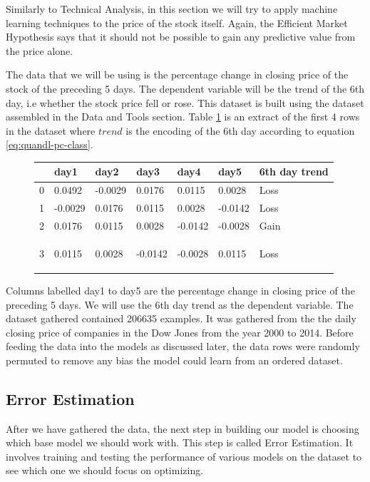 \documentclass{report}
\begin{document}
Similarly to Technical Analysis, in this section we will try to apply machine learning techniques to the price of the stock itself. Again, the Efficient Market Hypothesis says that it should not be possible to gain any predictive value from the price alone.

The data that we will be using is the percentage change in closing price of the stock of the preceding 5 days. The dependent variable will be the trend of the 6th day, i.e whether the stock price fell or rose. This dataset is built using the dataset assembled in the Data and Tools section. Table \ref{table:data-example-1} is an extract of the first 4 rows in the dataset where $trend$ is the encoding of the 6th day according to equation \ref{eq:quandl-pc-class}.

\begin{figure}
  \vspace{8pt}
    \begin{tabular}{l | l | l | l | l | l | l }
	& day1 & day2 &	day3 & day4 & day5  & 6th day trend \\ \hline
0	& 0.0492 &	-0.0029 &	0.0176 &	0.0115 &	0.0028 &	Loss\\ \hline
1	& -0.0029 &	0.0176 &	0.0115 &	0.0028 & -0.0142 &	Loss\\ \hline
2	& 0.0176 &	0.0115 &	0.0028 &	-0.0142 & -0.0028 &	Gain\\ \hline
3	& 0.0115 &	0.0028 &	-0.0142 &	-0.0028 &	0.0115 &	Loss

    \label{table:data-example-1}
    \end{tabular}
\end{figure}

 Columns labelled day1 to day5 are the percentage change in closing price of the preceding 5 days. We will use the 6th day trend as the dependent variable. The dataset gathered contained 206635 examples. It was gathered from the the daily closing price of companies in the Dow Jones from the year 2000 to 2014. Before feeding the data into the models as discussed later, the data rows were randomly permuted to remove any bias the model could learn from an ordered dataset.

\subsection{Error Estimation}

After we have gathered the data, the next step in building our model is choosing which base model we should work with. This step is called Error Estimation. It involves training and testing the performance of various models on the dataset to see which one we should focus on optimizing.
\end{document}
